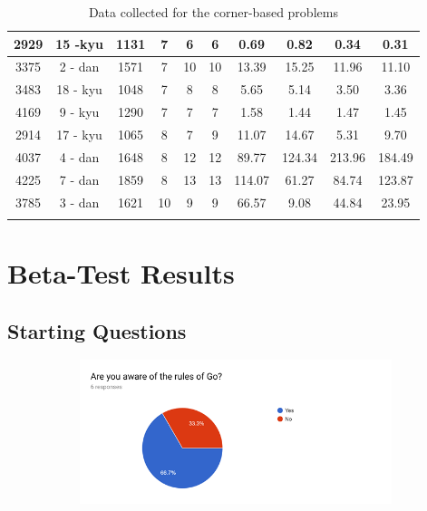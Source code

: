 \documentclass{l4proj}
\begin{document}
\begin{appendices}
\begin{longtable}{|c|c|c|c|c|c|c|c|c|c|}
2929 & 15 -kyu & 1131 & 7 & 6 & 6 & 0.69 & 0.82 & 0.34 & 0.31 \\ \hline
3375 & 2 - dan & 1571 & 7 & 10 & 10 & 13.39 & 15.25 & 11.96 & 11.10 \\ \hline
3483 & 18 - kyu & 1048 & 7 & 8 & 8 & 5.65 & 5.14 & 3.50 & 3.36 \\ \hline
4169 & 9 - kyu & 1290 & 7 & 7 & 7 & 1.58 & 1.44 & 1.47 & 1.45 \\ \hline
2914 & 17 - kyu & 1065 & 8 & 7 & 9 & 11.07 & 14.67 & 5.31 & 9.70 \\ \hline
4037 & 4 - dan & 1648 & 8 & 12 & 12 & 89.77 & 124.34 & 213.96 & 184.49 \\ \hline
4225 & 7 - dan & 1859 & 8 & 13 & 13 & 114.07 & 61.27 & 84.74 & 123.87 \\ \hline
3785 & 3 - dan & 1621 & 10 & 9 & 9 & 66.57 & 9.08 & 44.84 & 23.95 \\ \hline
\caption{ Data collected for the corner-based problems}
\label{table:data-corner}
\end{longtable}





\chapter{Beta-Test Results}

\section{Starting Questions}


\begin{figure}[H]
\centering
\begin{subfigure}[b]{\textwidth}
\centering
\includegraphics[width=\textwidth]{A1/1.png}
\end{subfigure}
\end{figure}


\end{appendices}
\end{document}
